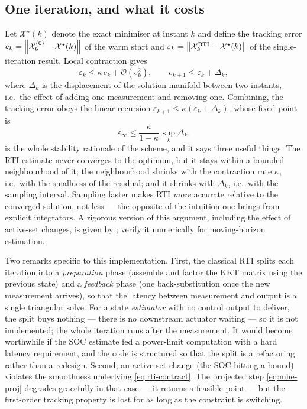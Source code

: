 \subsection{One iteration, and what it costs}
Let $\mathcal{X}^\star(k)$ denote the exact minimiser at instant $k$ and define the tracking error
$e_k = \left\lVert \mathcal{X}^{(0)}_k - \mathcal{X}^\star(k) \right\rVert$ of the warm start and
$\varepsilon_k = \left\lVert \mathcal{X}^{\text{RTI}}_k - \mathcal{X}^\star(k) \right\rVert$ of the single-iteration
result.  Local contraction gives
\begin{equation}\label{eq:rti-contract}
\varepsilon_k \le \kappa\, e_k + \mathcal{O}(e_k^2),
\qquad
e_{k+1} \le \varepsilon_k + \Delta_k,
\end{equation}
where $\Delta_k$ is the displacement of the solution manifold between two instants, i.e.\ the
effect of adding one measurement and removing one.  Combining, the tracking error obeys the
linear recursion $\varepsilon_{k+1}\le \kappa(\varepsilon_k + \Delta_k)$, whose fixed point is
\begin{equation}\label{eq:rti-fixed}
\varepsilon_\infty \le \frac{\kappa}{1-\kappa}\,\sup_k \Delta_k .
\end{equation}
 is the whole stability rationale of the scheme, and it says three useful things.
The RTI estimate never converges to the optimum, but it stays within a bounded neighbourhood of it;
the neighbourhood shrinks with the contraction rate $\kappa$, i.e.\ with the smallness of the
residual; and it shrinks with $\Delta_k$, i.e.\ with the sampling interval.  Sampling faster makes
RTI \emph{more} accurate relative to the converged solution, not less --- the opposite of the
intuition one brings from explicit integrators.  A rigorous version of this argument, including the
effect of active-set changes, is given by \citet{diehl2005rti}; \citet{kuhl2011rtimhe} verify it
numerically for moving-horizon estimation.

Two remarks specific to this implementation.  First, the classical RTI splits each iteration into a
\emph{preparation} phase (assemble and factor the KKT matrix using the previous state) and a
\emph{feedback} phase (one back-substitution once the new measurement arrives), so that the latency
between measurement and output is a single triangular solve.  For a state \emph{estimator} with no
control output to deliver, the split buys nothing --- there is no downstream actuator waiting --- so
it is not implemented; the whole iteration runs after the measurement.  It would become worthwhile
if the SOC estimate fed a power-limit computation with a hard latency requirement, and the code is
structured so that the split is a refactoring rather than a redesign.  Second, an active-set change
(the SOC hitting a bound) violates the smoothness underlying \cref{eq:rti-contract}.  The projected
step \cref{eq:mhe-proj} degrades gracefully in that case --- it returns a feasible point --- but the
first-order tracking property is lost for as long as the constraint is switching.

